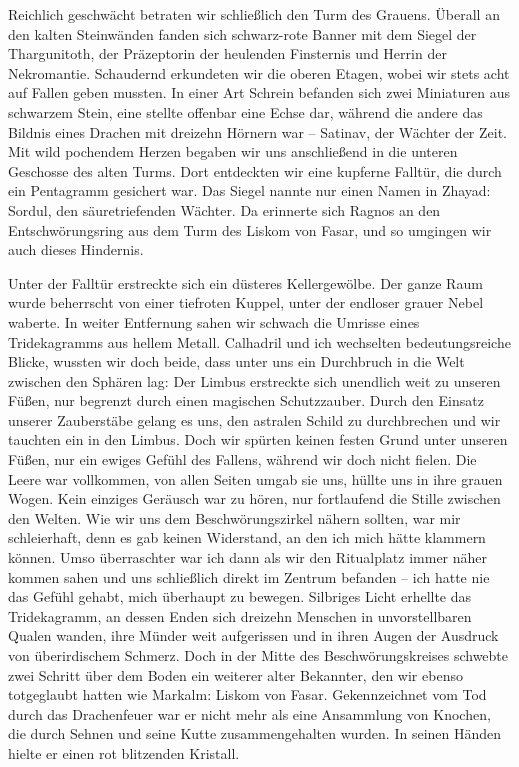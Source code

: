 \documentclass[11pt]{scrreprt}
\begin{document}
Reichlich geschwächt betraten wir schließlich den Turm des Grauens. Überall an den kalten Steinwänden fanden sich schwarz-rote Banner mit dem Siegel der Thargunitoth, der Präzeptorin der heulenden Finsternis und Herrin der Nekromantie. Schaudernd erkundeten wir die oberen Etagen, wobei wir stets acht auf Fallen geben mussten. In einer Art Schrein befanden sich zwei Miniaturen aus schwarzem Stein, eine stellte offenbar eine Echse dar, während die andere das Bildnis eines Drachen mit dreizehn Hörnern war – Satinav, der Wächter der Zeit. Mit wild pochendem Herzen begaben wir uns anschließend in die unteren Geschosse des alten Turms. Dort entdeckten wir eine kupferne Falltür, die durch ein Pentagramm gesichert war. Das Siegel nannte nur einen Namen in Zhayad: Sordul, den säuretriefenden Wächter. Da erinnerte sich Ragnos an den Entschwörungsring aus dem Turm des Liskom von Fasar, und so umgingen wir auch dieses Hindernis.\par

Unter der Falltür erstreckte sich ein düsteres Kellergewölbe. Der ganze Raum wurde beherrscht von einer tiefroten Kuppel, unter der endloser grauer Nebel waberte. In weiter Entfernung sahen wir schwach die Umrisse eines Tridekagramms aus hellem Metall. Calhadril und ich wechselten bedeutungsreiche Blicke, wussten wir doch beide, dass unter uns ein Durchbruch in die Welt zwischen den Sphären lag: Der Limbus erstreckte sich unendlich weit zu unseren Füßen, nur begrenzt durch einen magischen Schutzzauber. Durch den Einsatz unserer Zauberstäbe gelang es uns, den astralen Schild zu durchbrechen und wir tauchten ein in den Limbus. Doch wir spürten keinen festen Grund unter unseren Füßen, nur ein ewiges Gefühl des Fallens, während wir doch nicht fielen. Die Leere war vollkommen, von allen Seiten umgab sie uns, hüllte uns in ihre grauen Wogen. Kein einziges Geräusch war zu hören, nur fortlaufend die Stille zwischen den Welten. Wie wir uns dem Beschwörungszirkel nähern sollten, war mir schleierhaft, denn es gab keinen Widerstand, an den ich mich hätte klammern können. Umso überraschter war ich dann als wir den Ritualplatz immer näher kommen sahen und uns schließlich direkt im Zentrum befanden – ich hatte nie das Gefühl gehabt, mich überhaupt zu bewegen. Silbriges Licht erhellte das Tridekagramm, an dessen Enden sich dreizehn Menschen in unvorstellbaren Qualen wanden, ihre Münder weit aufgerissen und in ihren Augen der Ausdruck von überirdischem Schmerz. Doch in der Mitte des Beschwörungskreises schwebte zwei Schritt über dem Boden ein weiterer alter Bekannter, den wir ebenso totgeglaubt hatten wie Markalm: Liskom von Fasar. Gekennzeichnet vom Tod durch das Drachenfeuer war er nicht mehr als eine Ansammlung von Knochen, die durch Sehnen und seine Kutte zusammengehalten wurden. In seinen Händen hielte er einen rot blitzenden Kristall. \par
\end{document}
